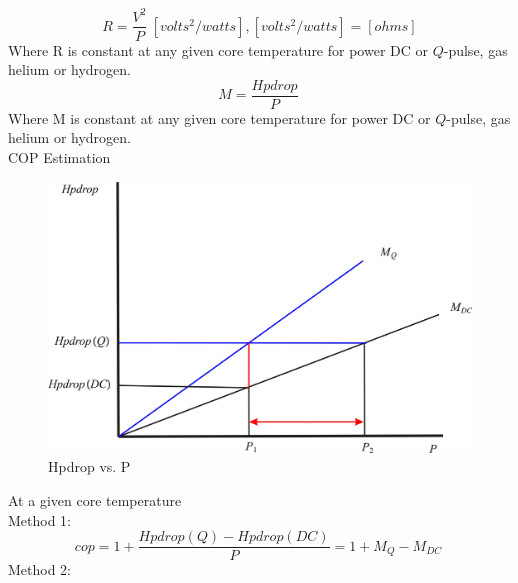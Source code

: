 \documentclass{article}
\begin{document}
\begin{equation}
R=\frac{V^{2}}{P}\ [volts^{2}/watts], [volts^{2}/watts]=[ohms]\label{3}%
\end{equation}
%
Where R is constant at any given core temperature for power DC or $Q$-pulse, gas helium or hydrogen.\\
\begin{equation}
M=\frac{Hpdrop}{P}\ \label{4}%
\end{equation}
%
Where M is constant at any given core temperature for power DC or $Q$-pulse, gas helium or hydrogen.\\
COP Estimation\\
\begin{figure}
[h]
\begin{center}
\includegraphics[scale=0.5]{jin1.jpg} 
\caption{Hpdrop vs. P}%
\end{center}
\end{figure}
At a given core temperature\\

Method 1:
\begin{equation}
cop=1+\frac{Hpdrop(Q)-Hpdrop(DC)}{P}= 1+M_{Q}-M_{DC}\ \label{4}%
\end{equation}
Method 2:\\
\end{document}
